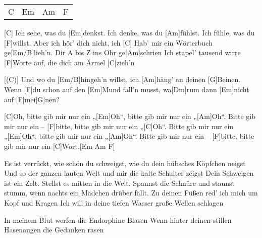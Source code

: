 

\begin{guitar}
	{\footnotesize\begin{tabular}{|l|l|l|l|}
			C & Em & Am & F
	\end{tabular} }
	
	[C] Ich sehe, was du [Em]denkst. Ich denke, was du [Am]fühlst.
	Ich fühle, was du [F]willst. Aber ich hör' dich nicht, ich
	[C] Hab' mir ein Wörterbuch ge[Em/B]lieh'n. Dir A bis Z ins Ohr ge[Am]schrien
	Ich stapel' tausend wirre [F]Worte auf, die dich am Ärmel [C]zieh'n
	
	[(C)] Und wo du [Em/B]hingeh'n willst, ich [Am]häng' an deinen [G]Beinen.
	Wenn [F]du schon auf den [Em]Mund fall'n musst, wa[Dm]rum dann [Em]nicht auf [F]mei[G]nen?
	
	\begin{highlightbar}
		[C]Oh, bitte gib mir nur ein „[Em]Oh“, bitte gib mir nur ein „[Am]Oh“.
		Bitte gib mir nur ein – [F]bitte, bitte gib mir nur ein „[C]Oh“.
		Bitte gib mir nur ein „[Em]Oh“, bitte gib mir nur ein „[Am]Oh“.
		Bitte gib mir nur ein – [F]bitte, bitte gib mir nur ein [C]Wort.[Em Am F]{}
	\end{highlightbar}
	
	\songsection{Strophe 2}
	Es ist verrückt, wie schön du schweigst, wie du dein hübsches Köpfchen neigst
	Und so der ganzen lauten Welt und mir die kalte Schulter zeigst
	Dein Schweigen ist ein Zelt. Stellst es mitten in die Welt.
	Spannst die Schnüre und staunst stumm, wenn nachts ein Mädchen drüber fällt.
	\songsection{Vorrefrain}
	Zu deinen Füßen red' ich mich um Kopf und Kragen
	Ich will in deine tiefen Wasser große Wellen schlagen
	
	\begin{highlightbar}
		 \songsnippet{Oh, bitte gib mir nur ein „Oh“, bitte gib mir nur ein „Oh“. ...}
	\end{highlightbar}
	
	In meinem Blut werfen die Endorphine Blasen
	Wenn hinter deinen stillen Hasenaugen die Gedanken rasen
	
	\begin{highlightbar}
		  \optionalChord{(x2)}
	\end{highlightbar}
\end{guitar}